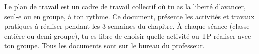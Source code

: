 \tetePremStssBiol
\reinitialiseActiviteTP
\vspace*{-8pt}

  Le plan de travail est un cadre de travail collectif où tu as la liberté d'avancer, seul-e ou en groupe, à ton rythme.  
  Ce document,  présente les activités et travaux pratiques à réaliser pendant les 3 semaines du chapitre.
  À chaque séance (classe entière ou demi-groupe), tu es libre de choisir quelle activité ou TP réaliser avec ton groupe.
  Tous les documents sont sur le bureau du professeur.


\vspace*{-16pt}

